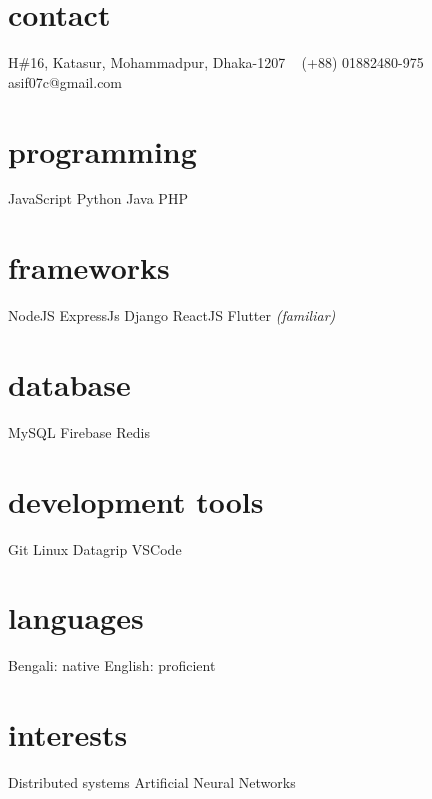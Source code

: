 \documentclass[10pt, print]{exponential-cv} %
\begin{document}

\begin{aside}
	\section{contact}
	H\#16, Katasur, Mohammadpur, Dhaka-1207
	~
	(+88) 01882480-975
	asif07c@gmail.com
	~
	\href{https://linkedin.com/in/aasifislam}{}
	~
	\section{programming}
	JavaScript
	Python
	Java
	PHP
	~
	\section{frameworks}
	NodeJS
	ExpressJs
	Django
	ReactJS
	Flutter \emph{(familiar)}
	~
	\section{database}
	MySQL
	Firebase
	Redis
	~
	\section{development tools}
	Git
	Linux
	Datagrip
	VSCode
	~
	\section{languages}
	Bengali: native
	English: proficient
	~
	\section{interests}
	Distributed systems
	Artificial Neural Networks
\end{aside}
\end{document}
